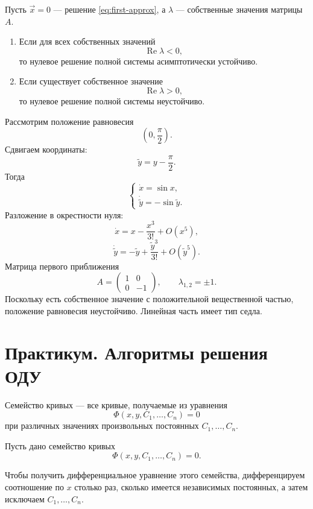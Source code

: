 \documentclass[12pt,a4paper]{article}
\numberwithin{equation}{section}
\renewcommand{\Re}{\operatorname{Re}}
\newcommand{\vect}[1]{\vec{#1}}
\begin{document}
\begin{theoremHSE}
Пусть $\vect{x}=0$ --- решение \eqref{eq:first-approx}, а $\lambda$ --- собственные значения матрицы $A$.
\begin{enumerate}
  \item Если для всех собственных значений
  \[
  \Re\lambda<0,
  \]
  то нулевое решение полной системы асимптотически устойчиво.
  \item Если существует собственное значение
  \[
  \Re\lambda>0,
  \]
  то нулевое решение полной системы неустойчиво.
\end{enumerate}
\end{theoremHSE}

\begin{exampleHSE}[Система $\dot x=\sin x$, $\dot y=\cos y$]
Рассмотрим положение равновесия
\[
\left(0,\frac{\pi}{2}\right).
\]
Сдвигаем координаты:
\[
\widetilde y=y-\frac{\pi}{2}.
\]
Тогда
\[
\begin{cases}
\dot x=\sin x,\\
\dot{\widetilde y}=-\sin\widetilde y.
\end{cases}
\]
Разложение в окрестности нуля:
\[
\dot x=x-\frac{x^3}{3!}+O(x^5),
\]
\[
\dot{\widetilde y}
=-\widetilde y+\frac{\widetilde y^3}{3!}+O(\widetilde y^5).
\]
Матрица первого приближения
\[
A=\begin{pmatrix}1&0\\0&-1\end{pmatrix},
\qquad \lambda_{1,2}=\pm1.
\]
Поскольку есть собственное значение с положительной вещественной частью, положение равновесия неустойчиво. Линейная часть имеет тип седла.
\end{exampleHSE}

\section[Практикум по ОДУ]{Практикум. Алгоритмы решения ОДУ}

\begin{definitionHSE}
Семейство кривых --- все кривые, получаемые из уравнения
\[\Phi(x,y,C_1,\ldots,C_n)=0\]
при различных значениях произвольных постоянных \(C_1,\ldots,C_n\).
\end{definitionHSE}

Пусть дано семейство кривых
\[\Phi(x, y, C_1,\ldots, C_n) = 0.\]

Чтобы получить дифференциальное уравнение этого семейства, дифференцируем соотношение по \(x\) столько раз, сколько имеется независимых постоянных, а затем исключаем \(C_1,\ldots,C_n\).
\end{document}
